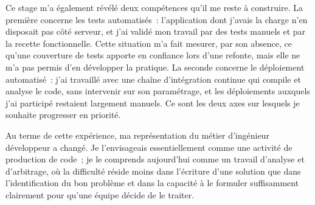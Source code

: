 Ce stage m'a également révélé deux compétences qu'il me reste à construire. La
première concerne les tests automatisés~: l'application dont j'avais la charge
n'en disposait pas côté serveur, et j'ai validé mon travail par des tests
manuels et par la recette fonctionnelle. Cette situation m'a fait mesurer, par
son absence, ce qu'une couverture de tests apporte en confiance lors d'une
refonte, mais elle ne m'a pas permis d'en développer la pratique. La seconde
concerne le déploiement automatisé~: j'ai travaillé avec une chaîne
d'intégration continue qui compile et analyse le code, sans intervenir sur son
paramétrage, et les déploiements auxquels j'ai participé restaient largement
manuels. Ce sont les deux axes sur lesquels je souhaite progresser en priorité.

Au terme de cette expérience, ma représentation du métier d'ingénieur
développeur a changé. Je l'envisageais essentiellement comme une activité de
production de code~; je le comprends aujourd'hui comme un travail d'analyse et
d'arbitrage, où la difficulté réside moins dans l'écriture d'une solution que
dans l'identification du bon problème et dans la capacité à le formuler
suffisamment clairement pour qu'une équipe décide de le traiter.
